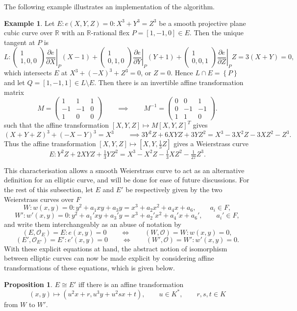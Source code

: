 \documentclass{article}
\newcommand{\R}{\mathbb{R}}
\newcommand{\val}[1]{\left. #1 \right\rvert}
\newcommand{\rb}[1]{\left( #1 \right)}
\renewcommand{\sb}[1]{\left[ #1 \right]}
\newcommand{\cb}[1]{\left\{ #1 \right\}}
\newcommand{\twobyone}[2]{\begin{pmatrix} #1 \\ #2 \end{pmatrix}}
\newcommand{\threebythree}[9]{\begin{pmatrix} #1 & #2 & #3 \\ #4 & #5 & #6 \\ #7 & #8 & #9 \end{pmatrix}}
\theoremstyle{definition}
\newtheorem*{example}{Example}
\newtheorem{proposition}{Proposition}[subsection]
\begin{document}
The following example illustrates an implementation of the algorithm.

\begin{example}
Let $ E : e\rb{X, Y, Z} = 0 : X^3 + Y^3 = Z^3 $ be a smooth projective plane cubic curve over $ \R $ with an $ \R $-rational flex $ P = \sb{1, -1, 0} \in E $. Then the unique tangent at $ P $ is
$$ L : \twobyone{1}{1, 0, 0}\val{\dfrac{\partial e}{\partial X}}_P\rb{X - 1} + \twobyone{1}{0, 1, 0}\val{\dfrac{\partial e}{\partial Y}}_P\rb{Y + 1} + \twobyone{1}{0, 0, 1}\val{\dfrac{\partial e}{\partial Z}}_PZ = 3\rb{X + Y} = 0, $$
which intersects $ E $ at $ X^3 + \rb{-X}^3 + Z^3 = 0 $, or $ Z = 0 $. Hence $ L \cap E = \cb{P} $ and let $ Q = \sb{1, -1, 1} \in L \setminus E $. Then there is an invertible affine transformation matrix
$$ M = \threebythree{1}{1}{1}{-1}{-1}{0}{1}{0}{0} \qquad \implies \qquad M^{-1} = \threebythree{0}{0}{1}{0}{-1}{-1}{1}{1}{0}. $$
such that the affine transformation $ \sb{X, Y, Z} \mapsto M\sb{X, Y, Z}^{T} $ gives
$$ \rb{X + Y + Z}^3 + \rb{-X - Y}^3 = X^3 \qquad \implies 3Y^2Z + 6XYZ + 3YZ^2 = X^3 - 3X^2Z - 3XZ^2 - Z^3. $$
Thus the affine transformation $ \sb{X, Y, Z} \mapsto \sb{X, Y, \tfrac{1}{3}Z} $ gives a Weierstrass curve
$$ E : Y^2Z + 2XYZ + \tfrac{1}{3}YZ^2 = X^3 - X^2Z - \tfrac{1}{3}XZ^2 - \tfrac{1}{27}Z^3. $$
\end{example}

This characterisation allows a smooth Weierstrass curve to act as an alternative definition for an elliptic curve, and will be done for ease of future discussions. For the rest of this subsection, let $ E $ and $ E' $ be respectively given by the two Weierstrass curves over $ F $
$$ W : w\rb{x, y} = 0 : y^2 + a_1xy + a_3y = x^3 + a_2x^2 + a_4x + a_6, \qquad a_i \in F, $$
$$ W' : w'\rb{x, y} = 0 : y^2 + a_1'xy + a_3'y = x^3 + a_2'x^2 + a_4'x + a_6', \qquad a_i' \in F, $$
and write them interchangeably as an abuse of notation by
$$ \rb{E, \mathcal{O}_E} = E : e\rb{x, y} = 0 \qquad \iff \qquad \rb{W, \mathcal{O}} = W : w\rb{x, y} = 0, $$
$$ \rb{E', \mathcal{O}_{E'}} = E' : e'\rb{x, y} = 0 \qquad \iff \qquad \rb{W', \mathcal{O}} = W' : w'\rb{x, y} = 0. $$
With these explicit equations at hand, the abstract notion of isomorphism between elliptic curves can now be made explicit by considering affine transformations of these equations, which is given below.

\begin{proposition}
\label{prop:affine}
$ E \cong E' $ iff there is an affine transformation
$$ \rb{x, y} \mapsto \rb{u^2x + r, u^3y + u^2sx + t}, \qquad u \in K^*, \qquad r, s, t \in K $$
from $ W $ to $ W' $.
\end{proposition}
\end{document}
